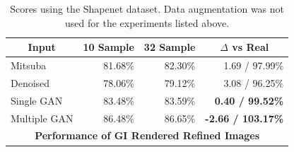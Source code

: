 \begin{table}[]
\centering
\begin{tabular}{|l|r|r|r|}
\hline
\multicolumn{1}{|c|}{\textbf{Input}}
& \multicolumn{1}{c|}{\textbf{10 Sample}}
& \multicolumn{1}{c|}{\textbf{32 Sample}}
& \multicolumn{1}{c|}{\textbf{$\Delta$ vs Real}} \\ \hline
Mitsuba		& 81.68\%	& 82.30\%	& 1.69 / 97.99\% \\
Denoised	& 78.06\%	& 79.12\%	& 3.08 / 96.25\%	\\
Single GAN	& 83.48\%	& 83.59\%	& \textbf{0.40 / 99.52\%}	\\
Multiple GAN& 86.48\%	& 86.65\% 	& \textbf{-2.66 / 103.17\%}		\\ \hline
\multicolumn{4}{|c|}{\textbf{Performance of GI Rendered Refined Images}}	\\ \hline
\end{tabular}
\caption{Scores using the Shapenet dataset. Data augmentation was not used for the experiments listed above.}
\label{tblallrefined}
\end{table}

